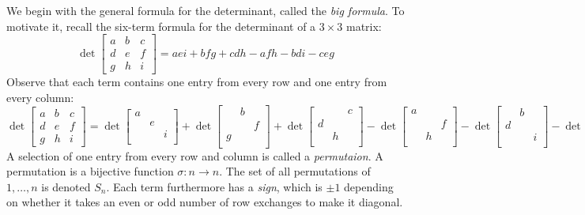 \documentclass[11pt,oneside]{amsbook}
\theoremstyle{definition}
\theoremstyle{plain}
\theoremstyle{definition}
\theoremstyle{remark}
\numberwithin{equation}{section}
\numberwithin{figure}{section}
\begin{document}
We begin with the general formula for the determinant, called the \emph{big formula}. To motivate it, recall the six-term formula for the determinant of a $3\times3$ matrix:
\[\det\begin{bmatrix}a&b&c\\d&e&f\\g&h&i\end{bmatrix}
  =aei+bfg+cdh-afh-bdi-ceg
\]
Observe that each term contains one entry from every row and one entry from every column:
\smaller\smaller\smaller
\[\det\begin{bmatrix}a&b&c\\d&e&f\\g&h&i\end{bmatrix}
  =\det\begin{bmatrix}a\\&e\\&&i\\\end{bmatrix}
  +\det\begin{bmatrix}&b\\&&f\\g\\\end{bmatrix}
  +\det\begin{bmatrix}&&c\\d\\&h\\\end{bmatrix}
  -\det\begin{bmatrix}a\\&&f\\&h\\\end{bmatrix}
  -\det\begin{bmatrix}&b\\d\\&&i\\\end{bmatrix}
  -\det\begin{bmatrix}&&c\\&e\\g\\\end{bmatrix}
\]
\normalsize
A selection of one entry from every row and column is called a \emph{permutaion}. A permutation is a bijective function $\sigma\colon n\to n$. The set of all permutations of $1,\ldots,n$ is denoted $S_n$. Each term furthermore has a \emph{sign}, which is $\pm1$ depending on whether it takes an even or odd number of row exchanges to make it diagonal.
\end{document}
